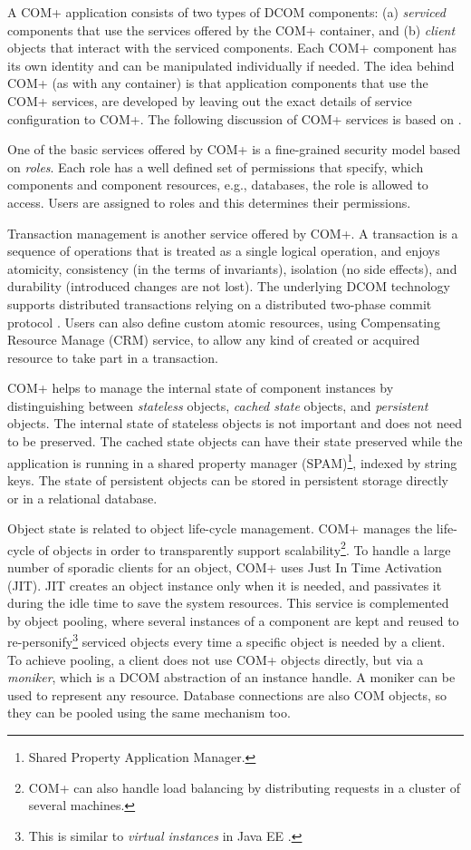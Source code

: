 A COM+ application consists of two types of DCOM components: (a) \textit{serviced} components that use the services offered by the COM+ container, and (b) \textit{client} objects that interact with the serviced components. Each COM+ component has its own identity and can be manipulated individually if needed. The idea behind COM+ (as with any container) is that application components that use the COM+ services, are developed by leaving out the exact details of service configuration to COM+. The following discussion of COM+ services is based on \cite{comp.services}.

One of the basic services offered by COM+ is a fine-grained security model based on \textit{roles}. Each role has a well defined set of permissions that specify, which components and component resources, e.g., databases, the role is allowed to access. Users are assigned to roles and this determines their permissions.

Transaction management is another service offered by COM+. A transaction is a sequence of operations that is treated as a single logical operation, and enjoys atomicity, consistency (in the terms of invariants), isolation (no side effects), and durability (introduced changes are not lost). The underlying DCOM technology supports distributed transactions relying on a distributed two-phase commit protocol \cite{Coulouris.01}. Users can also define custom atomic resources, using Compensating Resource Manage (CRM) service, to allow any kind of created or acquired resource to take part in a transaction.

COM+ helps to manage the internal state of component instances by distinguishing between \textit{stateless} objects, \textit{cached state} objects, and \textit{persistent} objects. The internal state of stateless objects is not important and does not need to be preserved. The cached state objects can have their state preserved while the application is running in a shared property manager (SPAM)\footnote{Shared Property Application Manager.}, indexed by string keys. The state of persistent objects can be stored in persistent storage directly or in a relational database. 

Object state is related to object life-cycle management. COM+ manages the life-cycle of objects in order to transparently support scalability\footnote{COM+ can also handle load balancing by distributing requests in a cluster of several machines.}. To handle a large number of sporadic clients for an object, COM+ uses Just In Time Activation (JIT). JIT creates an object instance only when it is needed, and passivates it during the idle time to save the system resources. This service is complemented by object pooling, where several instances of a component are kept and reused to re-personify\footnote{This is similar to \textit{virtual instances} in Java EE \cite{server.patterns.02}.} serviced objects every time a specific object is needed by a client. To achieve pooling, a client does not use COM+  objects directly, but via a \textit{moniker}, which is a DCOM abstraction of an instance handle. A moniker can be used to represent any resource. Database connections are also COM objects, so they can be pooled using the same mechanism too.

